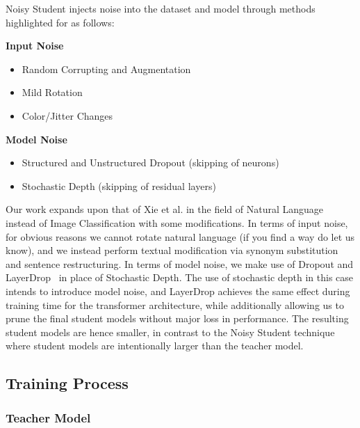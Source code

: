 \documentclass[12pt]{article}
\begin{document}
{Noisy Student injects noise into the dataset and model through methods highlighted for as follows:
\begin{multicols}{2}
\textbf{Input Noise}
\begin{itemize}
    \item Random Corrupting and Augmentation
    \item Mild Rotation
    \item Color/Jitter Changes
\end{itemize}
\columnbreak
\textbf{Model Noise}
\begin{itemize}
    \item Structured and Unstructured Dropout (skipping of neurons)
    \item Stochastic Depth (skipping of residual layers)
\end{itemize}
\end{multicols}

Our work expands upon that of Xie et al. in the field of Natural Language instead of Image Classification with some modifications. In terms of input noise, for obvious reasons we cannot rotate natural language (if you find a way do let us know), and we instead perform textual modification via synonym substitution and sentence restructuring. In terms of model noise, we make use of Dropout and LayerDrop~\cite{layerdrop} in place of Stochastic Depth. The use of stochastic depth in this case intends to introduce model noise, and LayerDrop achieves the same effect during training time for the transformer architecture, while additionally allowing us to prune the final student models without major loss in performance. The resulting student models are hence smaller, in contrast to the Noisy Student technique where student models are intentionally larger than the teacher model.


\subsection{Training Process}

\subsubsection{Teacher Model}

}
\end{document}
